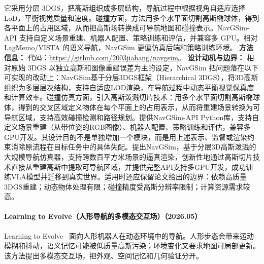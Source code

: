 它采用分层 3DGS，把高斯组织成多层结构，导航过程中根据视角自适应选择 LoD，平衡视觉质量和速度。碰撞方面，方法用多个水平面切割高斯椭球体，得到各平面上的占用区域，从而把高斯场转换成可导航地图和碰撞表示。NavGSim-API 支持自定义场景重建、机器人配置、策略训练和评估，并兼容多 GPU。相对 LagMemo/VISTA 的语义导航，NavGSim 更偏仿真后端和策略训练环境。
\textbf{方法信息：} 代码：\url{https://github.com/2003jiahang/navgsim}。
\textbf{设计动机与边界：} 相对原始 3DGS 以独立高斯和图像重建误差为主的设定，NavGSim 把问题落在以下可实现的改动上：NavGSim基于分层3DGS框架（Hierarchical 3DGS），将3D高斯组织为多层层次结构，支持自适应LOD渲染，在导航过程中动态平衡视觉保真度和计算效率。碰撞仿真方面，引入高斯泼溅切片技术：用多个水平面切割高斯椭球体，得到的交叉区域定义物体在每个平面上的占用表示，从而将重建场景转换为可导航区域，支持高效碰撞检测和路径规划。提供NavGSim-API Python库，支持自定义场景重建（从带位姿的RGB图像）、机器人配置、策略训练和评估，兼容多GPU开发。其设计目的不是单独增加一个模块，而是用上述表示、监督或渲染约束消除原流程在目标任务中的具体失配。提出NavGSim，基于分层3D高斯泼溅的大规模导航仿真器，支持跨数百平方米场景的逼真渲染，创新性地通过高斯切片技术直接从重建高斯中提取可导航区域，并提供完整API支持多GPU开发，成功训练VLA模型并迁移到真实世界。适用时还应保留论文给出的边界：依赖高质量3DGS重建；动态物体处理有限；碰撞精度受高斯分辨率限制；计算资源需求较高。
\paragraph{Learning to Evolve（人形导航的多模态交互场）（2026.05）}
Learning to Evolve~\cite{2605_21935} 面向人形机器人在动态环境中的导航。人形步态会带来运动模糊和抖动，语义记忆可能被低质量高斯污染；环境变化又要求地图可局部更新。该方法提出多模态交互场，把外观、空间记忆和几何验证分开。

